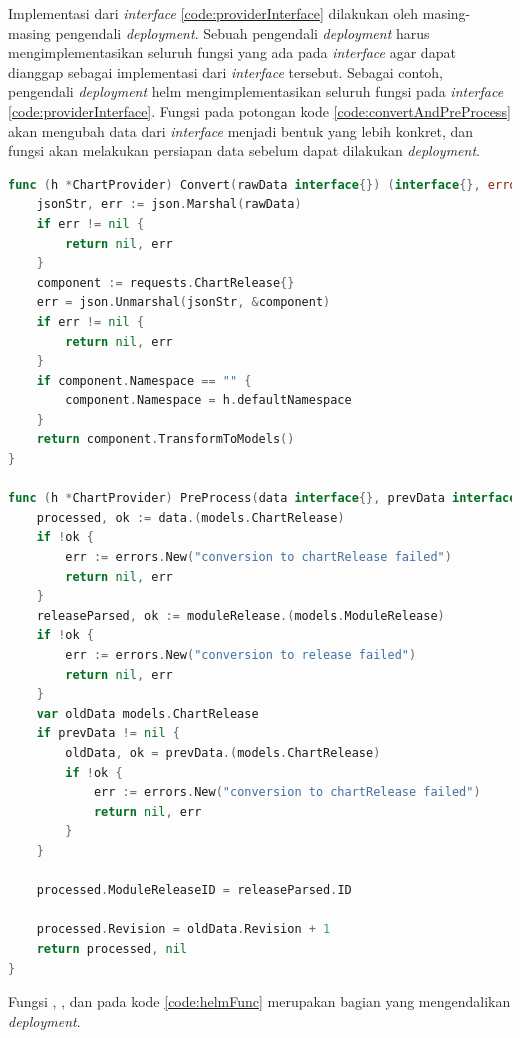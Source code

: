 Implementasi dari \textit{interface} \ref{code:providerInterface} dilakukan oleh masing-masing pengendali \textit{deployment}. Sebuah pengendali \textit{deployment} harus mengimplementasikan seluruh fungsi yang ada pada \textit{interface} agar dapat dianggap sebagai implementasi dari \textit{interface} tersebut. Sebagai contoh, pengendali \textit{deployment} helm mengimplementasikan seluruh fungsi pada \textit{interface} \ref{code:providerInterface}. Fungsi  pada potongan kode \ref{code:convertAndPreProcess} akan mengubah data dari \textit{interface} menjadi bentuk yang lebih konkret, dan fungsi  akan melakukan persiapan data sebelum dapat dilakukan \textit{deployment}.

\begin{lstlisting}[frame=single,language=Go,caption={Fungsi convert dan Pre-Process},label={code:convertAndPreProcess}]
func (h *ChartProvider) Convert(rawData interface{}) (interface{}, error) {
	jsonStr, err := json.Marshal(rawData)
	if err != nil {
		return nil, err
	}
	component := requests.ChartRelease{}
	err = json.Unmarshal(jsonStr, &component)
	if err != nil {
		return nil, err
	}
	if component.Namespace == "" {
		component.Namespace = h.defaultNamespace
	}
	return component.TransformToModels()
}

func (h *ChartProvider) PreProcess(data interface{}, prevData interface{}, module interface{}, moduleRelease interface{}) (interface{}, error) {
	processed, ok := data.(models.ChartRelease)
	if !ok {
		err := errors.New("conversion to chartRelease failed")
		return nil, err
	}
	releaseParsed, ok := moduleRelease.(models.ModuleRelease)
	if !ok {
		err := errors.New("conversion to release failed")
		return nil, err
	}
	var oldData models.ChartRelease
	if prevData != nil {
		oldData, ok = prevData.(models.ChartRelease)
		if !ok {
			err := errors.New("conversion to chartRelease failed")
			return nil, err
		}
	}

	processed.ModuleReleaseID = releaseParsed.ID

	processed.Revision = oldData.Revision + 1
	return processed, nil
}
\end{lstlisting}

Fungsi , , dan  pada kode \ref{code:helmFunc} merupakan bagian yang mengendalikan \textit{deployment}.

